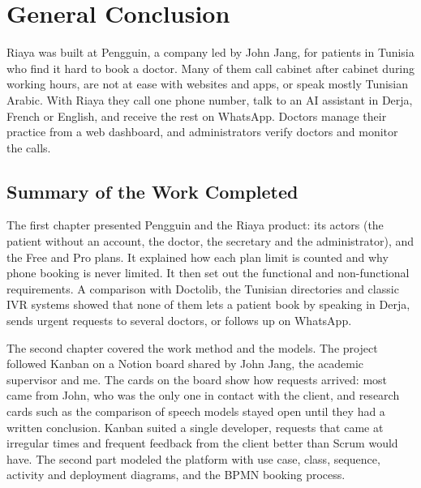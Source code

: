 \chapter*{General Conclusion}


Riaya was built at Pengguin, a company led by John Jang, for patients in Tunisia who find it hard to book a doctor. Many of them call cabinet after cabinet during working hours, are not at ease with websites and apps, or speak mostly Tunisian Arabic. With Riaya they call one phone number, talk to an AI assistant in Derja, French or English, and receive the rest on WhatsApp. Doctors manage their practice from a web dashboard, and administrators verify doctors and monitor the calls.

\section*{Summary of the Work Completed}

The first chapter presented Pengguin and the Riaya product: its actors (the patient without an account, the doctor, the secretary and the administrator), and the Free and Pro plans. It explained how each plan limit is counted and why phone booking is never limited. It then set out the functional and non-functional requirements. A comparison with Doctolib, the Tunisian directories and classic IVR systems showed that none of them lets a patient book by speaking in Derja, sends urgent requests to several doctors, or follows up on WhatsApp.

The second chapter covered the work method and the models. The project followed Kanban on a Notion board shared by John Jang, the academic supervisor and me. The cards on the board show how requests arrived: most came from John, who was the only one in contact with the client, and research cards such as the comparison of speech models stayed open until they had a written conclusion. Kanban suited a single developer, requests that came at irregular times and frequent feedback from the client better than Scrum would have. The second part modeled the platform with use case, class, sequence, activity and deployment diagrams, and the BPMN booking process.

